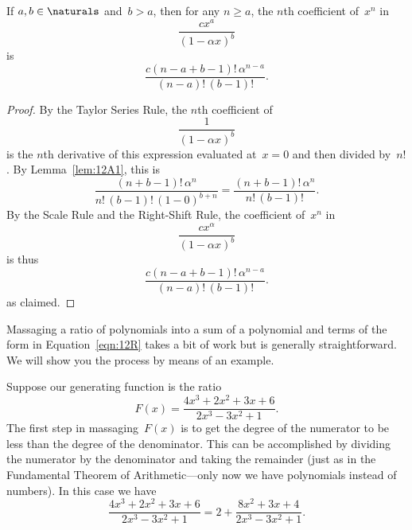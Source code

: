 \begin{corollary}\label{cor:12A2}
If $a, b \in \naturals$ and~$b > a$, then for any $n \ge a$, the $n$th
coefficient of~$x^n$ in
\begin{equation*}
    \frac{c x^a}{(1 - \alpha x)^b}
\end{equation*}
is
\begin{equation*}
    \frac{ c (n - a + b - 1)! \, \alpha^{n - a} }
         { (n - a)! \, (b - 1)! }.
\end{equation*}
\end{corollary}

\begin{proof}
By the Taylor Series Rule, the $n$th coefficient of
\begin{equation*}
    \frac{1}{(1 - \alpha x)^b}
\end{equation*}
is the $n$th derivative of this expression evaluated at~$x = 0$ and
then divided by~$n!$.  By Lemma~\ref{lem:12A1}, this is
\begin{equation*}
\frac{ (n + b - 1)! \, \alpha^n }
     { n! \, (b - 1)! \, (1 - 0)^{b + n} }
  =
\frac{ (n + b - 1)! \, \alpha^n }
     { n! \, (b - 1)! }.
\end{equation*}
By the Scale Rule and the Right-Shift Rule, the coefficient of~$x^n$
in 
\begin{equation*}
\frac{ c x^\alpha }{ (1 - \alpha x)^b }
\end{equation*}
is thus
\begin{equation*}
    \frac{ c (n - a + b - 1)! \, \alpha^{n - a} }
         { (n - a)! \, (b - 1)! }.
\end{equation*}
as claimed.
\end{proof}

Massaging a ratio of polynomials into a sum of a polynomial and terms
of the form in Equation~\ref{eqn:12R} takes a bit of work but is
generally straightforward.  We will show you the process by means of
an example.

Suppose our generating function is the ratio
\begin{equation}\label{eqn:12T2}
    F(x) = \frac{4 x^3 + 2 x^2 + 3 x + 6}{2 x^3 - 3 x^2 + 1}.
\end{equation}
The first step in massaging~$F(x)$ is to get the degree of the
numerator to be less than the degree of the denominator.  This can be
accomplished by dividing the numerator by the denominator and taking
the remainder (just as in the Fundamental Theorem of Arithmetic---only
now we have polynomials instead of numbers).  In this case we have
\begin{equation*}
\frac{4 x^3 + 2 x^2 + 3 x + 6}{2 x^3 - 3 x^2 + 1}
    = 2 + \frac{8 x^2 + 3 x + 4}{2 x^3 - 3 x^2 + 1}.
\end{equation*}

